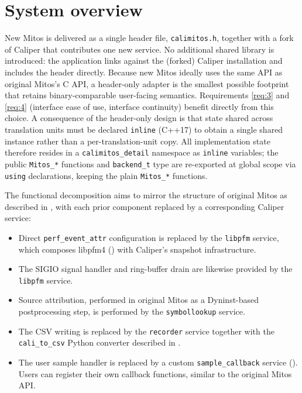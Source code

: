 \section{System overview}\label{sec:calimitos-overview}

New Mitos is delivered as a single header file, \texttt{calimitos.h}, together with a fork of Caliper that contributes one new service. No additional shared library is introduced: the application links against the (forked) Caliper installation and includes the header directly. Because new Mitos ideally uses the same API as original Mitos's C API, a header-only adapter is the smallest possible footprint that retains binary-comparable user-facing semantics. Requirements \ref{req:3} and \ref{req:4} (interface ease of use, interface continuity) benefit directly from this choice. A consequence of the header-only design is that state shared across translation units must be declared \texttt{inline} (C++17) to obtain a single shared instance rather than a per-translation-unit copy\cite{cppreference.com}. All implementation state therefore resides in a \texttt{calimitos\_detail} namespace as \texttt{inline} variables; the public \texttt{Mitos\_*} functions and \texttt{backend\_t} type are re-exported at global scope via \texttt{using} declarations, keeping the plain \texttt{Mitos\_*} functions.

The functional decomposition aims to mirror the structure of original Mitos as described in , with each prior component replaced by a corresponding Caliper service:
\begin{itemize}
    \item Direct \texttt{perf\_event\_attr} configuration is replaced by the \texttt{libpfm} service, which composes libpfm4 () with Caliper's snapshot infrastructure.
    \item The SIGIO signal handler and ring-buffer drain are likewise provided by the \texttt{libpfm} service.
    \item Source attribution, performed in original Mitos as a Dyninst-based postprocessing step, is performed by the \texttt{symbollookup} service.
    \item The CSV writing is replaced by the \texttt{recorder} service together with the \texttt{cali\_to\_csv} Python converter described in .
    \item The user sample handler is replaced by a custom \texttt{sample\_callback} service (). Users can register their own callback functions, similar to the original Mitos API.
\end{itemize}

